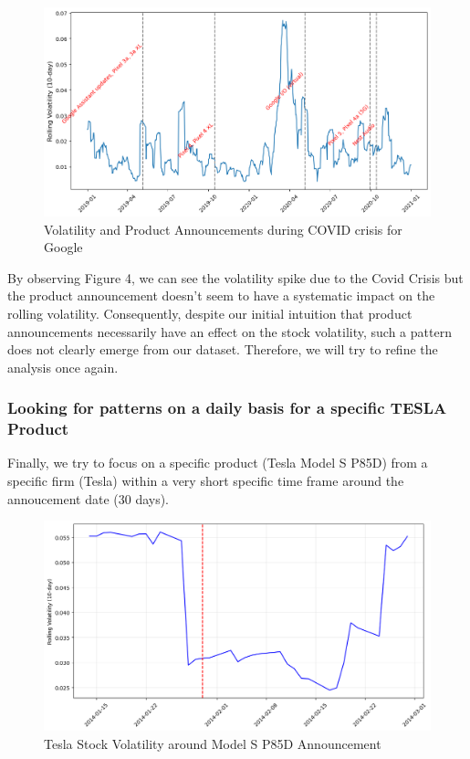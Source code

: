 \documentclass[12pt, oneside]{article}
\begin{document}
\begin{figure}[H]
    \centering
    \includegraphics[width=0.8\linewidth]{GOOG_pattern.png}
    \caption{Volatility and Product Announcements during COVID crisis for Google}
    \label{fig:GOOG_pattern}
\end{figure}

By observing Figure 4, we can see the volatility spike due to the Covid Crisis but the product announcement doesn't seem to have a systematic impact on the rolling volatility. Consequently, despite our initial intuition that product announcements necessarily have an effect on the stock volatility, such a pattern does not clearly emerge from our dataset. Therefore, we will try to refine the analysis once again.

\subsubsection{Looking for patterns on a daily basis for a specific TESLA Product}
Finally, we try to focus on a specific product (Tesla Model S P85D) from a specific firm (Tesla) within a very short specific time frame around the annoucement date (30 days).

\begin{figure}[H]
    \centering
    \includegraphics[width=0.8\linewidth]{TESLA_pattern.png}
    \caption{Tesla Stock Volatility around Model S P85D Announcement}
    \label{fig:TESLA_pattern}
\end{figure}
\end{document}
